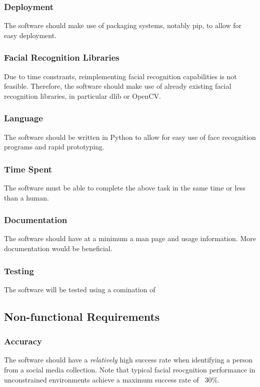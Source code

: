 \documentclass{article}
\begin{document}
\subsubsection{Deployment}
The software should make use of packaging systems, notably pip, to allow for easy deployment.

\subsubsection{Facial Recognition Libraries}
Due to time constrants, reimplementing facial recognition capabilities is not feasible. Therefore, the software should make use of already existing facial recognition libraries, in particular dlib or OpenCV.

\subsubsection{Language}
The software should be written in Python to allow for easy use of face recognition programs and rapid prototyping.

\subsubsection{Time Spent}
The software must be able to complete the above task in the same time or less than a human.

\subsubsection{Documentation}
The software should have at a minimum a man page and usage information. More documentation would be beneficial.

\subsubsection{Testing}
The software will be tested using a comination of 

\subsection{Non-functional Requirements}
\subsubsection{Accuracy}
The software should have a \textit{relatively} high success rate when identifying a person from a social media collection. Note that typical facial reocgnition performance in unconstrained environments achieve a maximum success rate of ~30\%.
\end{document}
